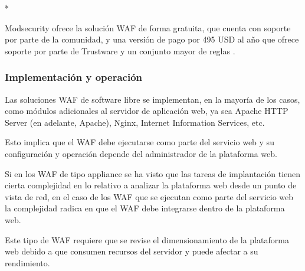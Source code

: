 \par \hypertarget{modlic}{*} Modsecurity ofrece la solución WAF de forma gratuita, que cuenta con soporte por parte de la
comunidad, y una versión de pago por 495 USD al año que ofrece soporte por parte de Trustware\cite{trustware} y un conjunto mayor de reglas
\cite{modsecuritysupport}.

\subsubsection{Implementación y operación}
\par Las soluciones WAF de software libre se implementan, en la mayoría de los casos, como módulos adicionales al servidor de aplicación web,
ya sea Apache HTTP Server\cite{apache} (en adelante, Apache), Nginx\cite{nginx}, Internet Information Services\cite{iis}, etc.
\par Esto implica que el WAF debe ejecutarse como parte del servicio web y su configuración y operación depende del administrador de la
plataforma web.
\par Si en los WAF de tipo appliance se ha visto que las tareas de implantación tienen cierta complejidad en lo relativo a analizar la
plataforma web desde un punto de vista de red, en el caso de los WAF que se ejecutan como parte del servicio web la complejidad radica en que
el WAF debe integrarse dentro de la plataforma web.
\par Este tipo de WAF requiere que se revise el dimensionamiento de la plataforma web debido a que consumen recursos del servidor y puede
afectar a su rendimiento.

